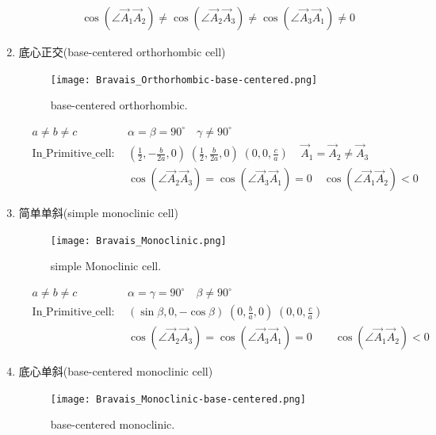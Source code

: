 \documentclass{article}      %
\begin{document}
\begin{enumerate}
\begin{displaymath}
\begin{aligned}
		& &\cos(\angle\vec A_1\vec A_2)\neq\cos(\angle\vec A_2\vec A_3)\neq\cos(\angle\vec A_3\vec A_1)\neq0
	\end{aligned}
\end{displaymath}
		\item 底心正交(\textrm{base-centered orthorhombic cell})
\begin{figure}[h!]
\centering
\texttt{[image: Bravais\_Orthorhombic-base-centered.png]}
\caption{\small base-centered orthorhombic.}%
\label{Bravais:orthorhombic-base-centered}
\end{figure}
\begin{displaymath}
	\begin{aligned}
		&a\neq b\neq c &\alpha=\beta=90^{\circ}\quad\gamma\neq90^{\circ} \\
	&\mathrm{In\_Primitive\_cell}:~&(\frac12,-\frac{b}{2a},0)\;(\frac12,\frac{b}{2a},0)\;(0,0,\frac{c}{a})\;\;\;\;\vec A_1=\vec A_2\neq\vec A_3\\
		& &\cos(\angle\vec A_2\vec A_3)=\cos(\angle\vec A_3\vec A_1)=0\quad\cos(\angle\vec A_1\vec A_2)<0
	\end{aligned}
\end{displaymath}
		\item 简单单斜(\textrm{simple monoclinic cell})
\begin{figure}[h!]
\centering
\texttt{[image: Bravais\_Monoclinic.png]}
\caption{\small simple Monoclinic cell.}%
\label{Bravais:monoclinic}
\end{figure}
\begin{displaymath}
	\begin{aligned}
		&a\neq b\neq c &\alpha=\gamma=90^{\circ}\quad\beta\neq90^{\circ} \\
	&\mathrm{In\_Primitive\_cell}:~&(\sin\beta,0,-\cos\beta)\;(0,\frac{b}{a},0)\;(0,0,\frac{c}{a})\\
		& &\cos(\angle\vec A_2\vec A_3)=\cos(\angle\vec A_3\vec A_1)=0\qquad\cos(\angle\vec A_1\vec A_2)<0
	\end{aligned}
\end{displaymath}
		\item 底心单斜(\textrm{base-centered monoclinic cell})
\begin{figure}[h!]
\centering
\texttt{[image: Bravais\_Monoclinic-base-centered.png]}
\caption{\small base-centered monoclinic.}%
\label{Bravais:base-centered monoclinic}
\end{figure}
\begin{displaymath}

\end{displaymath}
\end{enumerate}
\end{document}
